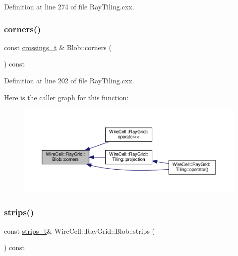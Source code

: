 Definition at line 274 of file Ray\+Tiling.\+cxx.

\mbox{\label{class_wire_cell_1_1_ray_grid_1_1_blob_afe8d4f5b3c993780eecf4944e92fdd55}} 
\subsubsection{\texorpdfstring{corners()}{corners()}}
{\footnotesize\ttfamily const \hyperlink{namespace_wire_cell_1_1_ray_grid_a100185dcaa66f6b2b42c53c40c37fb49}{crossings\+\_\+t} \& Blob\+::corners (\begin{DoxyParamCaption}{ }\end{DoxyParamCaption}) const}



Definition at line 202 of file Ray\+Tiling.\+cxx.

Here is the caller graph for this function\+:
\nopagebreak
\begin{figure}[H]
\begin{center}
\leavevmode
\includegraphics[width=350pt]{class_wire_cell_1_1_ray_grid_1_1_blob_afe8d4f5b3c993780eecf4944e92fdd55_icgraph}
\end{center}
\end{figure}
\mbox{\label{class_wire_cell_1_1_ray_grid_1_1_blob_a4334dac5e1c417337fc156c828036966}} 
\subsubsection{\texorpdfstring{strips()}{strips()}\hspace{0.1cm}{\footnotesize\ttfamily [1/2]}}
{\footnotesize\ttfamily const \hyperlink{namespace_wire_cell_1_1_ray_grid_a06c9ce08c0358d22fae3185aff8a9b7c}{strips\+\_\+t}\& Wire\+Cell\+::\+Ray\+Grid\+::\+Blob\+::strips (\begin{DoxyParamCaption}{ }\end{DoxyParamCaption}) const\hspace{0.3cm}{\ttfamily [inline]}}



